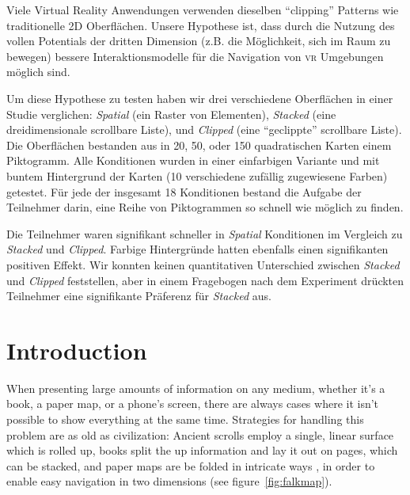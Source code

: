 \documentclass[nobib]{tufte-book} %
\begin{document}
Viele Virtual Reality Anwendungen verwenden dieselben ``clipping'' Patterns wie traditionelle 2D Oberfl{\"a}chen. Unsere Hypothese ist, dass durch die Nutzung des vollen Potentials der dritten Dimension (z.B. die M{\"o}glichkeit, sich im Raum zu bewegen) bessere Interaktionsmodelle f{\"u}r die Navigation von \textsc{vr} Umgebungen m{\"o}glich sind.

Um diese Hypothese zu testen haben wir drei verschiedene Oberfl{\"a}chen in einer Studie verglichen: \emph{Spatial} (ein Raster von Elementen), \emph{Stacked} (eine dreidimensionale scrollbare Liste), und \emph{Clipped} (eine ``geclippte'' scrollbare Liste). Die Oberfl{\"a}chen bestanden aus in 20, 50, oder 150 quadratischen Karten einem Piktogramm. Alle Konditionen wurden in einer einfarbigen Variante und mit buntem Hintergrund der Karten (10 verschiedene zuf{\"a}llig zugewiesene Farben) getestet. F{\"u}r jede der insgesamt 18 Konditionen bestand die Aufgabe der Teilnehmer darin, eine Reihe von Piktogrammen so schnell wie m{\"o}glich zu finden.

Die Teilnehmer waren signifikant schneller in \emph{Spatial} Konditionen im Vergleich zu \emph{Stacked} und \emph{Clipped}. Farbige Hintergr{\"u}nde hatten ebenfalls einen signifikanten positiven Effekt. Wir konnten keinen quantitativen Unterschied zwischen \emph{Stacked} und \emph{Clipped} feststellen, aber in einem Fragebogen nach dem Experiment dr{\"u}ckten Teilnehmer eine signifikante Pr{\"a}ferenz f{\"u}r \emph{Stacked} aus.


\chapter{Introduction} %

When presenting large amounts of information on any medium, whether it's a book, a paper map, or a phone's screen, there are always cases where it isn't possible to show everything at the same time. Strategies for handling this problem are as old as civilization: Ancient scrolls employ a single, linear surface which is rolled up, books split the up information and lay it out on pages, which can be stacked, and paper maps are be folded in intricate ways \cite{angsusser2012map}, in order to enable easy navigation in two dimensions (see figure~\ref{fig:falkmap}).
\end{document}
